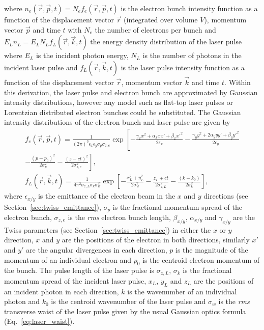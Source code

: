 \documentclass[../main.tex]{subfiles}
\begin{document}
where $n_{e}\left(\overrightarrow{r},\overrightarrow{p},t\right) = N_{e}f_{e}\left(\overrightarrow{r},\overrightarrow{p},t\right)$ is the  electron bunch intensity function as a function of the displacement vector $\overrightarrow{r}$ (integrated over volume $V$), momentum vector $\overrightarrow{p}$ and time $t$ with $N_{e}$ the number of electrons per bunch and $E_{L}n_{L} = E_{L}N_{L}f_{L}\left(\overrightarrow{r},\overrightarrow{k},t\right)$ the energy density distribution of the laser pulse where $E_{L}$ is the incident photon energy, $N_{L}$ is the number of photons in the incident laser pulse and $f_{L}\left(\overrightarrow{r},\overrightarrow{k},t\right)$ is the laser pulse intensity function as a function of the displacement vector $\overrightarrow{r}$, momentum vector $\overrightarrow{k}$ and time $t$. Within this derivation, the laser pulse and electron bunch are approximated by Gaussian intensity distributions, however any model such as flat-top laser pulses or Lorentzian distributed electron bunches could be substituted. The Gaussian intensity distributions of the electron bunch and laser pulse are given by \cite{sun2011theoretical}
\begin{gather} %
f_{e}\left(\overrightarrow{r},\overrightarrow{p},t\right) = \frac{1}{\left(2\pi\right)^{3}\epsilon_{x}\epsilon_{y}\sigma_{p}\sigma_{z,e}}\exp\left[-\frac{\gamma_{x}x^{2}+\alpha_{x}xx'+\beta_{x}x'^{2}}{2\epsilon_{x}}-\frac{\gamma_{y}y^{2}+2\alpha_{y}yy'+\beta_{y}y'^{2}}{2\epsilon_{y}}\right.\\\left.-\frac{\left(p-p_{0}\right)^{2}}{2\sigma_{p}^{2}}-\frac{\left(z-ct\right)^{2}}{2\sigma_{z,e}^{2}}\right], \nonumber
\label{eq:electron_gaussian_intensity_distribution} \\
f_{L}\left(\overrightarrow{r},\overrightarrow{k},t\right) = \frac{1}{4\pi^{2}\sigma_{z,L}\sigma_{k}\sigma_{w}^{2}}\exp\left[-\frac{x_{L}^{2}+y_{L}^{2}}{2\sigma_{w}^{2}}-\frac{z_{L}+ct}{2\sigma_{z,L}^{2}}-\frac{\left(k-k_{0}\right)}{2\sigma_{k}^{2}}\right],
\label{eq:laser_gaussian_intensity_distribution}
\end{gather}
where $\epsilon_{x/y}$ is the emittance of the electron beam in the $x$ and $y$ directions (see Section~\ref{sec:twiss_emittance}), $\sigma_{p}$ is the fractional momentum spread of the electron bunch, $\sigma_{z,e}$ is the \textit{rms} electron bunch length, $\beta_{x/y}$, $\alpha_{x/y}$ and $\gamma_{x/y}$ are the Twiss parameters (see Section~\ref{sec:twiss_emittance}) in either the $x$ or $y$ direction, $x$ and $y$ are the positions of the electron in both directions, similarly $x'$ and $y'$ are the angular divergences in each direction, $p$ is the magnitude of the momentum of an individual electron and $p_{0}$ is the centroid electron momentum of the bunch. The pulse length of the laser pulse is $\sigma_{z,L}$, $\sigma_{k}$ is the fractional momentum spread of the incident laser pulse, $x_{L}$, $y_{L}$ and $z_{L}$ are the positions of an incident photon in each direction, $k$ is the wavenumber of an individual photon and $k_{0}$ is the centroid wavenumber of the laser pulse and $\sigma_{w}$ is the \textit{rms} transverse waist of the laser pulse given by the usual Gaussian optics formula (Eq.~\ref{eq:laser_waist}).
\end{document}
